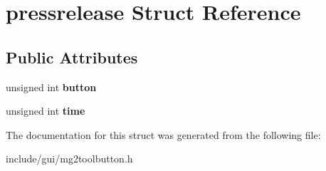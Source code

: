 \hypertarget{structpressrelease}{}\section{pressrelease Struct Reference}
\label{structpressrelease}
\subsection*{Public Attributes}
\begin{DoxyCompactItemize}
\item 
\mbox{\label{structpressrelease_aa1e390079537a752f6f5637407ae57f3}} 
unsigned int {\bfseries button}
\item 
\mbox{\label{structpressrelease_aeb0385b6ae3130c7652405ca5ad4494e}} 
unsigned int {\bfseries time}
\end{DoxyCompactItemize}


The documentation for this struct was generated from the following file\+:\begin{DoxyCompactItemize}
\item 
include/gui/mg2toolbutton.\+h\end{DoxyCompactItemize}
